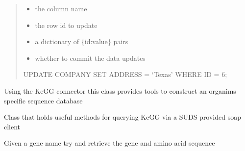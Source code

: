 \documentclass[letterpaper,10pt,english]{sphinxmanual}
\begin{document}
\begin{fulllineitems}
\begin{fulllineitems}
\begin{quote}
\begin{itemize}
\item {} 
\sphinxAtStartPar
{} the column name

\item {} 
\sphinxAtStartPar
{} the row id to update

\item {} 
\sphinxAtStartPar
{} a dictionary of \{id:value\} pairs

\item {} 
\sphinxAtStartPar
{} whether to commit the data updates

\end{itemize}

\sphinxAtStartPar
UPDATE COMPANY SET ADDRESS = ‘Texas’ WHERE ID = 6;
\end{quote}

\end{fulllineitems}


\end{fulllineitems}


\begin{fulllineitems}
\label{\detokenize{modules_doc:cbmpy.CBNetDB.KeGGSequenceTools}}
\pysigstartsignatures
{}
\pysigstopsignatures
\sphinxAtStartPar
Using the KeGG connector this class provides tools to construct an organims specific sequence database

\end{fulllineitems}


\begin{fulllineitems}
\label{\detokenize{modules_doc:cbmpy.CBNetDB.KeGGTools}}
\pysigstartsignatures
{}
\pysigstopsignatures
\sphinxAtStartPar
Class that holds useful methods for querying KeGG via a SUDS provided soap client

\begin{fulllineitems}
\label{\detokenize{modules_doc:cbmpy.CBNetDB.KeGGTools.fetchSeqfromKeGG}}
\pysigstartsignatures
{}
\pysigstopsignatures
\sphinxAtStartPar
Given a gene name try and retrieve the gene and amino acid sequence

\end{fulllineitems}


\end{fulllineitems}
\end{document}
